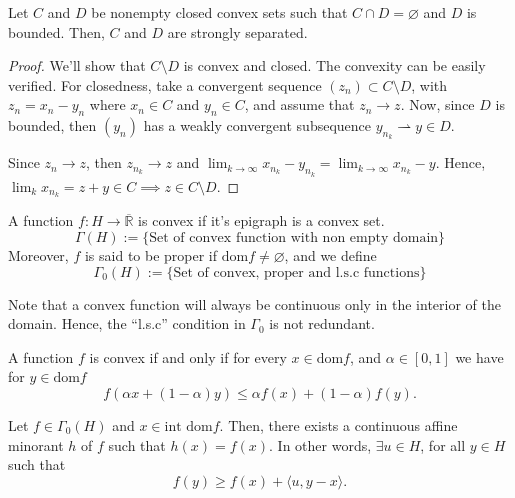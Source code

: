 \begin{corollary}
    Let $C$ and $D$ be nonempty closed convex sets such that $C \cap D = \varnothing$ and
    $D$ is bounded. Then, $C$ and $D$ are strongly separated.
\end{corollary}

\begin{proof}
    We'll show that $C \setminus D$ is convex and closed. The convexity can be easily verified.
    For closedness, take a convergent sequence $(z_n) \subset C \setminus D$, with $z_n = x_n - y_n$ where
    $x_n \in C$ and $y_n \in C$, and assume that $z_n \to z$.
    Now, since $D$ is bounded, then $(y_n)$ has a weakly convergent
    subsequence $y_{n_k} \rightharpoonup y \in D$.

    Since $z_n \to z$, then $z_{n_k} \to z$ and
    $\lim_{k \to \infty} x_{n_k} - y_{n_k} = \lim_{k \to \infty} x_{n_k} - y$.
    Hence, $\lim_k x_{n_k} = z + y \in C \implies z \in C \setminus D$.
\end{proof}

\begin{definition}
   A function $f:H \to \overline{\mathbb R}$ is convex if it's epigraph is a convex set. 
   \begin{displaymath}
       \Gamma (H) :=\{\text{Set of convex function with non empty domain}\}
   \end{displaymath}
   Moreover, $f$ is said to be proper if $\text{dom} f \neq \varnothing$, and we define
   \begin{displaymath}
       \Gamma_0 (H) :=\{\text{Set of convex, proper and l.s.c functions}\}
   \end{displaymath}
   
\end{definition}

Note that a convex function will always be continuous only in the interior of the domain.
Hence, the ``l.s.c'' condition in $\Gamma_0$ is not redundant.

\begin{theorem}
    A function $f$ is convex if and only if for every $x \in \text{dom} f$, and $\alpha \in [0,1]$
    we have for $y \in \text{dom} f$
    \begin{displaymath}
        f(\alpha x + (1-\alpha)y) \leq \alpha f(x) + (1-\alpha)f(y).
    \end{displaymath}
    
\end{theorem}

\begin{theorem}
    Let $f \in \Gamma_0(H)$ and  $x \in \text{int dom} f$. Then, there exists a continuous
    affine minorant $h$ of $f$ such that $h(x) = f(x)$.
    In other words, $\exists u \in H$, for all $y \in H$ such that
    \begin{displaymath}
        f(y) \geq f(x) + \langle u, y-x\rangle.
    \end{displaymath}
\end{theorem}

